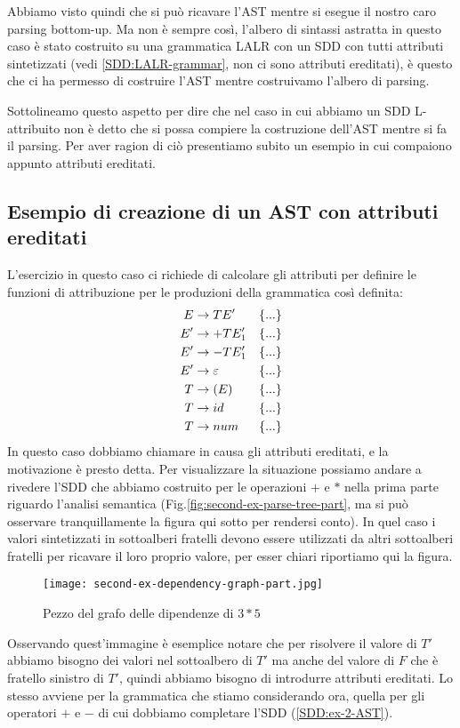 \documentclass[class=book, crop=false, oneside, 12pt]{standalone}
\begin{document}
Abbiamo visto quindi che si può ricavare l'AST mentre si esegue il nostro caro parsing bottom-up.
Ma non è sempre così, l'albero di sintassi astratta in questo caso è stato costruito su una grammatica LALR con un SDD con tutti attributi sintetizzati (vedi \ref{SDD:LALR-grammar}, non ci sono attributi ereditati), è questo che ci ha permesso di costruire l'AST mentre costruivamo l'albero di parsing.

Sottolineamo questo aspetto per dire che nel caso in cui abbiamo un SDD L-attribuito non è detto che si possa compiere la costruzione dell'AST mentre si fa il parsing. Per aver ragion di ciò presentiamo subito un esempio in cui compaiono appunto attributi ereditati.

\subsection{Esempio di creazione di un AST con attributi ereditati}
L'esercizio in questo caso ci richiede di calcolare gli attributi per definire le funzioni di attribuzione per le produzioni della grammatica così definita:
\begin{align}
    \label{SDD:ex-2-AST}
    E &\to TE' & & \{...\} \\ 
    E'&\to +TE_1' & & \{...\} \notag \nonumber \\ 
    E'&\to -TE_1' & & \{...\} \notag \nonumber \\ 
    E'&\to \varepsilon & & \{...\} \notag \nonumber \\ 
    T &\to (E) & & \{...\} \notag \nonumber \\ 
    T &\to id & & \{...\} \notag \nonumber \\ 
    T &\to num & & \{...\} \notag \nonumber
\end{align}
In questo caso dobbiamo chiamare in causa gli attributi ereditati, e la motivazione è presto detta.
Per visualizzare la situazione possiamo andare a rivedere l'SDD che abbiamo costruito per le operazioni \(+\) e \(*\) nella prima parte riguardo l'analisi semantica (Fig.\ref{fig:second-ex-parse-tree-part}, ma si può osservare tranquillamente la figura  qui sotto per rendersi conto).
In quel caso i valori sintetizzati in sottoalberi fratelli devono essere utilizzati da altri sottoalberi fratelli per ricavare il loro proprio valore, per esser chiari riportiamo qui la figura.
\begin{figure}[H]
    \centering
    \texttt{[image: second-ex-dependency-graph-part.jpg]}
    \caption{Pezzo del grafo delle dipendenze di \(3*5\)}
\end{figure}
Osservando quest'immagine è esemplice notare che per risolvere il valore di \(T'\) abbiamo bisogno dei valori nel sottoalbero di \(T'\) ma anche del valore di \(F\) che è fratello sinistro di \(T'\), quindi abbiamo bisogno di introdurre attributi ereditati.
Lo stesso avviene per la grammatica che stiamo considerando ora, quella per gli operatori \(+\) e \(-\) di cui dobbiamo completare l'SDD (\ref{SDD:ex-2-AST}).
\end{document}
